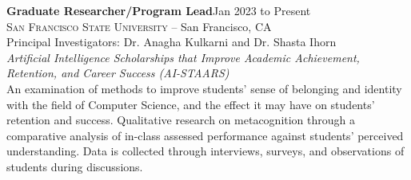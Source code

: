 \documentclass[hidelinks, 10.5pt]{article}
\def\contentwidth{0.9\linewidth}    %
\def\contentblockspacing{2.5mm}     %
\def\contentheaderspacing{1mm}      %
\begin{document}
{\vspace{\contentblockspacing}

\begin{minipage}[ct]{\contentwidth}
    \textbf{Graduate Researcher/Program Lead}\hfill Jan 2023 to Present\\
    \textsc{San Francisco State University} -- San Francisco, CA\\
    Principal Investigators: Dr. Anagha Kulkarni and Dr. Shasta Ihorn
    \vspace{\contentheaderspacing}\\
    {\textit{Artificial Intelligence Scholarships that Improve Academic Achievement, Retention, and Career Success (AI-STAARS)}}\\
    An examination of methods to improve students' sense of belonging and identity with the field of Computer Science,
    and the effect it may have on students' retention and success.  Qualitative research on metacognition through a comparative
    analysis of in-class assessed performance against students' perceived understanding.  Data is collected through interviews, surveys,
    and observations of students during discussions.
\end{minipage}

\vspace{\contentblockspacing}

}
\end{document}
